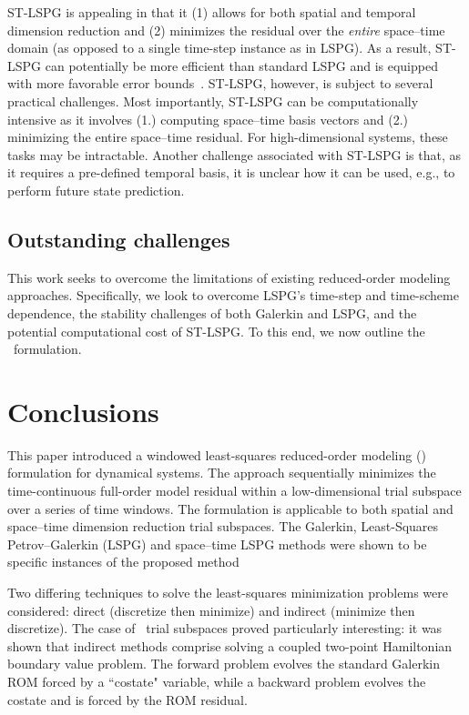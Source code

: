 \documentclass[3p,computermodern,10pt]{elsarticle}
\begin{document}
ST-LSPG is appealing in that it (1) allows for both spatial and temporal dimension reduction and (2) minimizes the residual over the \textit{entire} space--time domain (as opposed to a single time-step instance as in LSPG). As a result, ST-LSPG can potentially be more efficient than standard LSPG and is equipped with more favorable error bounds~\cite{choi_stlspg}. ST-LSPG, however, is subject to several practical challenges.  Most importantly, ST-LSPG can be computationally 
intensive as it involves (1.) computing space--time basis vectors and (2.) minimizing the entire space--time residual. For high-dimensional systems, these tasks may be intractable. Another challenge associated with ST-LSPG is that, as it requires a pre-defined temporal basis, it is unclear how it can be used, e.g., to perform future state prediction.
  
\subsection{Outstanding challenges}
This work seeks to overcome the limitations of existing reduced-order modeling approaches. Specifically, 
we look to overcome LSPG's time-step and time-scheme dependence, the stability challenges of both Galerkin and LSPG, and the potential computational cost of ST-LSPG. To this end, we now outline the \methodNameLower\ formulation. 
%

%
%






\section{Conclusions}\label{sec:conclude}
This paper introduced a windowed least-squares reduced-order modeling (\methodAcronym) formulation for dynamical systems. The approach sequentially minimizes the time-continuous full-order model residual within a low-dimensional trial subspace over a series of time windows. The formulation is applicable to both spatial and space--time dimension reduction trial subspaces. The Galerkin, Least-Squares Petrov--Galerkin (LSPG) and space--time LSPG methods were shown to be specific instances of the proposed method 


Two differing techniques to solve the least-squares minimization problems were considered: direct (discretize then minimize) and indirect (minimize then discretize). 
The case of \spatialAcronym\ trial subspaces proved particularly interesting: it was shown that indirect methods comprise solving a coupled two-point 
Hamiltonian boundary value problem. The forward problem evolves the standard Galerkin ROM forced by a ``costate" variable, while a backward problem evolves the costate and is forced by the ROM residual.
\end{document}
